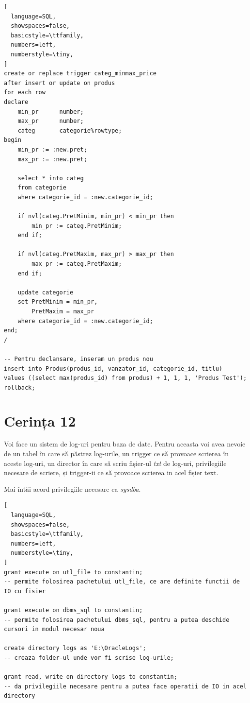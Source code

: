 \documentclass[12pt]{article}
\begin{document}
\begin{lstlisting}[
  language=SQL,
  showspaces=false,
  basicstyle=\ttfamily,
  numbers=left,
  numberstyle=\tiny,
]
create or replace trigger categ_minmax_price
after insert or update on produs
for each row
declare
    min_pr      number;
    max_pr      number;
    categ       categorie%rowtype;
begin    
    min_pr := :new.pret;
    max_pr := :new.pret;
    
    select * into categ
    from categorie
    where categorie_id = :new.categorie_id;
    
    if nvl(categ.PretMinim, min_pr) < min_pr then
        min_pr := categ.PretMinim;
    end if;
    
    if nvl(categ.PretMaxim, max_pr) > max_pr then
        max_pr := categ.PretMaxim;
    end if;
    
    update categorie
    set PretMinim = min_pr,
        PretMaxim = max_pr
    where categorie_id = :new.categorie_id;
end;
/

-- Pentru declansare, inseram un produs nou
insert into Produs(produs_id, vanzator_id, categorie_id, titlu)
values ((select max(produs_id) from produs) + 1, 1, 1, 'Produs Test');
rollback;
\end{lstlisting}

\pagebreak

\section{Cerința 12}
Voi face un sistem de log-uri pentru baza de date. Pentru aceasta voi avea nevoie de un tabel în 
care să păstrez log-urile, un trigger ce să provoace scrierea în aceste log-uri, un director în care să 
scriu fișier-ul \textit{txt} de log-uri, privilegiile necesare de scriere, și trigger-ii ce să provoace
scrierea in acel fișier text.

\vspace{1em}

Mai întăi acord privilegiile necesare ca \textit{sysdba}.

\vspace{0.5em}

\begin{lstlisting}[
  language=SQL,
  showspaces=false,
  basicstyle=\ttfamily,
  numbers=left,
  numberstyle=\tiny,
]
grant execute on utl_file to constantin;
-- permite folosirea pachetului utl_file, ce are definite functii de IO cu fisier

grant execute on dbms_sql to constantin;
-- permite folosirea pachetului dbms_sql, pentru a putea deschide cursori in modul necesar noua

create directory logs as 'E:\OracleLogs';
-- creaza folder-ul unde vor fi scrise log-urile;

grant read, write on directory logs to constantin;
-- da privilegiile necesare pentru a putea face operatii de IO in acel directory
\end{lstlisting}
\end{document}
